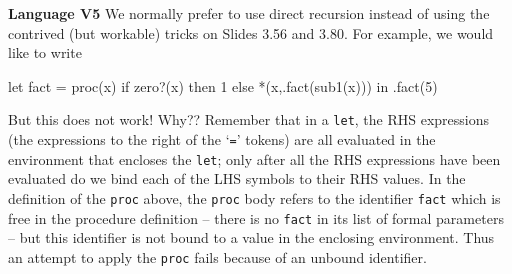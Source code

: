 \begin{minipage}[t]{\sw}
\slidenumber
\LARGE
{\bf Language V5}\exx
We normally prefer to use direct recursion instead
of using the contrived (but workable) tricks on Slides 3.56 and 3.80.
For example, we would like to write
\Large
\begin{qv}
let
  fact = proc(x) if zero?(x) then 1 else *(x,.fact(sub1(x)))
in
  .fact(5)
\end{qv}
\LARGE
But this does not work! Why??\exx
Remember that in a \verb'let',
the RHS expressions
(the expressions to the right of the `\verb'='' tokens)
are all evaluated
in the environment that encloses the \verb'let';
only after all the RHS expressions have been evaluated
do we bind each of the LHS symbols to their RHS values.\exx
In the definition of the \verb'proc' above,
the \verb'proc' body refers to the identifier \verb'fact'
which is free in the procedure definition --
there is no \verb'fact' in its list of formal parameters --
but this identifier is not bound to a value
in the enclosing environment.
Thus an attempt to apply the \verb'proc'
fails because of an unbound identifier.
\end{minipage}
\clearpage
